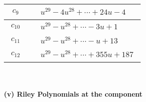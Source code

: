 \documentclass[1p]{elsarticle_modified}
\theoremstyle{definition}
\begin{document}
\begin{tabular}{m{50pt}|m{274pt}}
\hline $$\begin{aligned}c_{9}\end{aligned}$$&$\begin{aligned}
&u^{29}-4 u^{28}+\cdots+24 u-4
\end{aligned}$\\
\hline $$\begin{aligned}c_{10}\end{aligned}$$&$\begin{aligned}
&u^{29}- u^{28}+\cdots-3 u+1
\end{aligned}$\\
\hline $$\begin{aligned}c_{11}\end{aligned}$$&$\begin{aligned}
&u^{29}- u^{28}+\cdots- u+13
\end{aligned}$\\
\hline $$\begin{aligned}c_{12}\end{aligned}$$&$\begin{aligned}
&u^{29}- u^{28}+\cdots+355 u+187
\end{aligned}$\\
\hline
\end{tabular}\\~\\
\newpage\renewcommand{\arraystretch}{1}
\flushleft \textbf{(v) Riley Polynomials at the component}\newline \\
\end{document}
